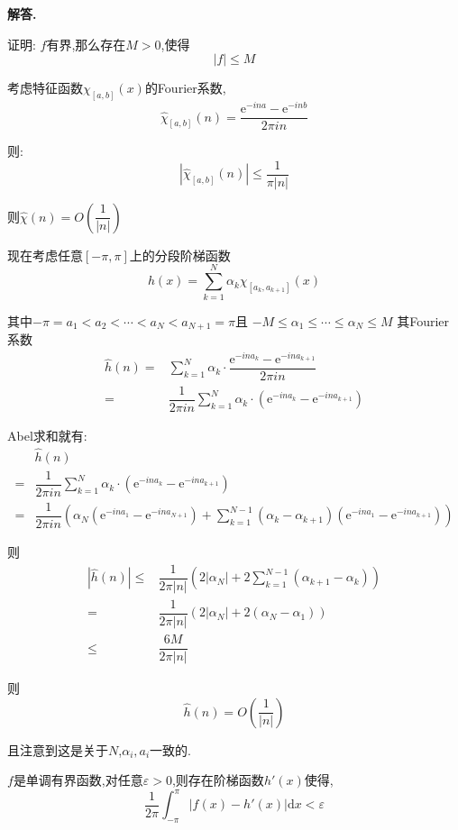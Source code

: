 \documentclass[12pt, a4paper, oneside]{ctexart}
\newenvironment{solution}{\par\noindent\textbf{解答. }}{\par}
\begin{document}
\begin{solution}
\par
证明: $f$有界,那么存在$M>0$,使得
$$
\left|f\right|\leqslant M
$$
\par
考虑特征函数$\chi_{[a,b]}(x)$的Fourier系数,
$$
\hat{\chi}_{[a,b]}(n)=\dfrac{\mathrm{e}^{-ina}-\mathrm{e}^{-inb}}{2\pi in}
$$
\par
则:
$$
\left|\hat{\chi}_{[a,b]}(n)\right|\leqslant \dfrac{1}{\pi |n|}
$$
\par
则$\hat{\chi}(n)= O\left(\dfrac{1}{|n|}\right)$
\par
现在考虑任意$[-\pi,\pi]$上的分段阶梯函数
$$
h(x)=\sum_{k=1}^{N}\alpha_k\chi_{[a_k,a_{k+1}]}(x)
$$
\par
其中$-\pi=a_1<a_2<\cdots<a_N<a_{N+1}=\pi$且
$-M\leqslant \alpha_1\leqslant \cdots \leqslant \alpha_N\leqslant M$
其Fourier系数
$$
\begin{aligned}
\hat{h}(n)=&\sum_{k=1}^{N}\alpha_k\cdot \dfrac{\mathrm{e}^{-ina_k}-\mathrm{e}^{-ina_{k+1}}}{2\pi in}\\
=&\dfrac{1}{2\pi in}\sum_{k=1}^{N}\alpha_k \cdot (\mathrm{e}^{-ina_k}-\mathrm{e}^{-ina_{k+1}})
\end{aligned}
$$
\par
Abel求和就有:
$$
\begin{aligned}
&\hat{h}(n)\\
=&\dfrac{1}{2\pi in}\sum_{k=1}^{N}\alpha_k \cdot (\mathrm{e}^{-ina_k}-\mathrm{e}^{-ina_{k+1}})\\
=&\dfrac{1}{2\pi in}\left(\alpha_N\left(\mathrm{e}^{-ina_1}-\mathrm{e}^{-ina_{N+1}}\right)
+\sum_{k=1}^{N-1}(\alpha_k-\alpha_{k+1})
\left(\mathrm{e}^{-ina_1}-\mathrm{e}^{-ina_{k+1}}\right)\right)
\end{aligned}
$$
\par
则
$$
\begin{aligned}
\left|\hat{h}(n)\right|
\leqslant & \dfrac{1}{2\pi |n|}\left(2|\alpha_N|
+2\sum_{k=1}^{N-1}(\alpha_{k+1}-\alpha_{k})\right)\\
= & \dfrac{1}{2\pi |n|}\left(2|\alpha_N|
+2(\alpha_{N}-\alpha_{1})\right)\\
\leqslant & \dfrac{6M}{2\pi |n|}
\end{aligned}
$$
\par
则
$$
\hat{h}(n)=O\left(\dfrac{1}{|n|}\right)
$$
\par
且注意到这是关于$N$,$\alpha_i,a_i$一致的.
\par
$f$是单调有界函数,对任意$\varepsilon>0$,则存在阶梯函数$h'(x)$使得,
$$
\dfrac{1}{2\pi}\int_{-\pi}^{\pi}|f(x)-h'(x)|\mathrm{d}x<\varepsilon
$$
\end{solution}
\end{document}
